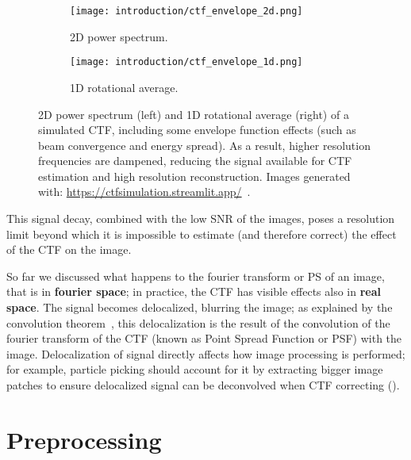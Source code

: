 \begin{figure}[ht]
    \centering
    \begin{subfigure}[B]{.42\textwidth}
        \centering
        \texttt{[image: introduction/ctf\_envelope\_2d.png]}
        \caption{2D power spectrum.}
        \label{fig:em_ctf_envelope_2d}
    \end{subfigure}%
    \hfill
    \begin{subfigure}[B]{.55\textwidth}
        \centering
        \texttt{[image: introduction/ctf\_envelope\_1d.png]}
        \caption{1D rotational average.}
        \label{fig:em_ctf_envelope_1d}
    \end{subfigure}%
    \caption[CTF: effect of the envelope function]{2D power spectrum (left) and 1D rotational average (right) of a simulated CTF, including some envelope function effects (such as beam convergence and energy spread). As a result, higher resolution frequencies are dampened, reducing the signal available for CTF estimation and high resolution reconstruction. Images generated with: \url{https://ctfsimulation.streamlit.app/}~\cite{jiangWebbasedSimulationContrast2001}.}
    \label{fig:em_ctf_envelope}
\end{figure}

This signal decay, combined with the low SNR of the images, poses a resolution limit beyond which it is impossible to estimate (and therefore correct) the effect of the CTF on the image.

So far we discussed what happens to the fourier transform or PS of an image, that is in \textbf{fourier space}; in practice, the CTF has visible effects also in \textbf{real space}.
The signal becomes delocalized, blurring the image; as explained by the convolution theorem~\cite{wikipediaConvolutionTheorem2024}, this delocalization is the result of the convolution of the fourier transform of the CTF (known as Point Spread Function or PSF) with the image.
Delocalization of signal directly affects how image processing is performed; for example, particle picking should account for it by extracting bigger image patches to ensure delocalized signal can be deconvolved when CTF correcting ().

\section{Preprocessing}\label{em_preprocessing}

